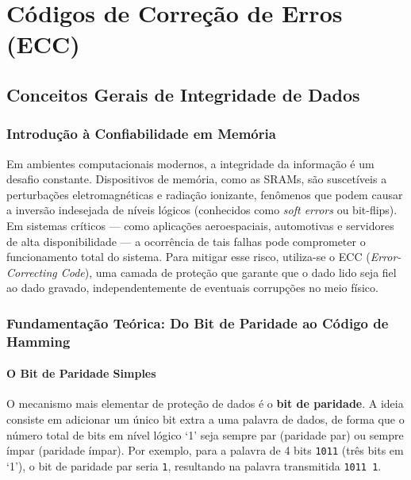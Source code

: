 \documentclass[12pt,a4paper]{article}
\begin{document}
\section{Códigos de Correção de Erros (ECC)}
\label{sec:eccs}

\subsection{Conceitos Gerais de Integridade de Dados}

\subsubsection{Introdução à Confiabilidade em Memória}
Em ambientes computacionais modernos, a integridade da informação é um desafio constante. Dispositivos de memória, como as SRAMs, são suscetíveis a perturbações eletromagnéticas e radiação ionizante, fenômenos que podem causar a inversão indesejada de níveis lógicos (conhecidos como \textit{soft errors} ou bit-flips). Em sistemas críticos — como aplicações aeroespaciais, automotivas e servidores de alta disponibilidade — a ocorrência de tais falhas pode comprometer o funcionamento total do sistema. Para mitigar esse risco, utiliza-se o ECC (\textit{Error-Correcting Code}), uma camada de proteção que garante que o dado lido seja fiel ao dado gravado, independentemente de eventuais corrupções no meio físico.

\subsubsection{Fundamentação Teórica: Do Bit de Paridade ao Código de Hamming}

\paragraph{O Bit de Paridade Simples}
O mecanismo mais elementar de proteção de dados é o \textbf{bit de paridade}. 
A ideia consiste em adicionar um único bit extra a uma palavra de dados, de 
forma que o número total de bits em nível lógico `1' seja sempre par 
(paridade par) ou sempre ímpar (paridade ímpar). Por exemplo, para a palavra 
de 4 bits \texttt{1011} (três bits em `1'), o bit de paridade par seria 
\texttt{1}, resultando na palavra transmitida \texttt{1011\,1}.
\end{document}
